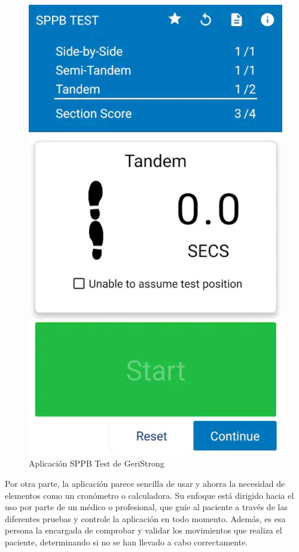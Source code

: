 \begin{figure}[H]
	\centering
	\includegraphics[scale=0.35]{imagenes/sppb_geristrong.jpg}
	\caption{Aplicación SPPB Test de GeriStrong\cite{GeriStrong}\label{fig:geriStrong}}
\end{figure}

Por otra parte, la aplicación parece sencilla de usar y ahorra la necesidad de elementos como un cronómetro o calculadora. Su enfoque está dirigido hacia el uso por parte de un médico o profesional, que guíe al paciente a través de las diferentes pruebas y controle la aplicación en todo momento. Además, es esa persona la encargada de comprobar y validar los movimientos que realiza el paciente, determinando si no se han llevado a cabo correctamente.

